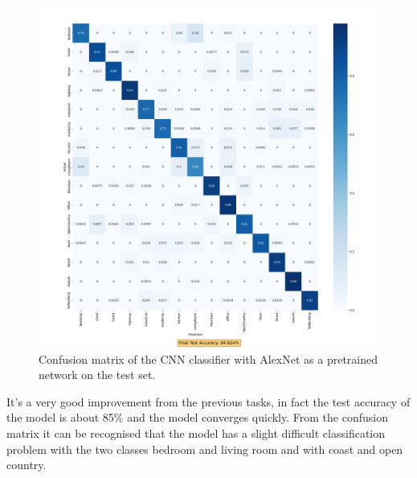 \documentclass[12pt, a4paper, italian]{scrartcl}
\begin{document}
 \newpage
 
  \begin{figure} [h!]
 \centering
  { \includegraphics[width=.85\textwidth]{fig/confusion_matrix_task_3.png} \caption{Confusion matrix of the CNN classifier with AlexNet as a pretrained network on the test set.
}} 
  \end{figure}
  
It's a very good improvement from the previous tasks, in fact the test accuracy of the model is about 85\% and the model converges quickly.
From the confusion matrix it can be recognised that the model has a slight difficult classification problem with the two classes bedroom and living room and with coast and open country.





\newpage
\end{document}
